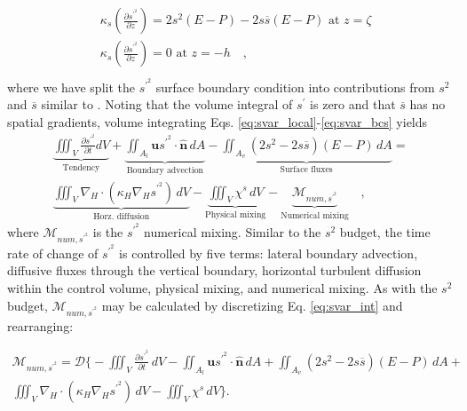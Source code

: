 \begin{align} \label{eq:svar_bcs}
    \begin{split}
         & \kappa_s \left({\frac{\partial s^{\prime^2}}{\partial z}} \right) = 2s^2(E-P) -2s \overline{s}(E-P) \,\, \textrm{at} \,\, z = \zeta \\
         & \kappa_s \left({\frac{\partial s^{\prime^2}}{\partial z}} \right) = 0 \,\, \textrm{at} \,\, z = -h \quad ,\\
    \end{split}
\end{align}
where we have split the $s^{\prime^2}$ surface boundary condition into contributions from $s^2$ and $\overline{s}$ similar to \citet{Lorenz_2021}. 
Noting that the volume integral of $s^\prime$ is zero and that $\overline{s}$ has no spatial gradients, volume integrating Eqs. \ref{eq:svar_local}-\ref{eq:svar_bcs} yields
\begin{equation} \label{eq:svar_int}
    \begin{split}
        \underbrace{\iiint_V \frac{\partial s^{\prime^2}}{\partial t} dV}_{\text{Tendency}} + \underbrace{\iint_{A_l} \mathbf{u}s^{\prime^2} \cdot \hat{\mathbf{n}} \, dA}_{\text{Boundary advection}}  - \underbrace{\iint_{A_{v}} \left(2s^2-2s \overline{s} \right)(E-P) \, dA}_{\text{Surface fluxes}} = \\
        \underbrace{\iiint_{V} \nabla_H \cdot \left( \kappa_H \nabla_H s^{\prime^2} \right) \, dV}_{\text{Horz. diffusion}}-
        \underbrace{\iiint_V \chi^s  \, dV}_{\text{Physical mixing}} - \underbrace{\mathcal{M}_{num, s^{\prime^2}}}_\text{Numerical mixing} \quad ,
   \end{split}
\end{equation}
where $\mathcal{M}_{num, s^{\prime^2}}$ is the $s^{\prime^2}$ numerical mixing. Similar to the $s^2$ budget, the time rate of change of $s^{\prime^2}$ is controlled by five terms: lateral boundary advection, diffusive fluxes through the vertical boundary, horizontal turbulent diffusion within the control volume, physical mixing, and numerical mixing. As with the $s^2$ budget, $\mathcal{M}_{num, s^{\prime^2}}$ may be calculated by discretizing Eq. \ref{eq:svar_int} and rearranging:

\begin{equation} \label{eq:sprime2_mnum}
    \begin{split}
        \mathcal{M}_{num, s^{\prime^2}} = \mathcal{D} \biggl\{-\iiint_V \frac{\partial s^{\prime^2}}{\partial t} \, dV - \iint_{A_l} \mathbf{u}s^{\prime^2} \cdot \hat{\mathbf{n}} \,  dA + \iint_{A_{v}} \left(2s^2-2s \overline{s} \right)(E-P) \, dA + \\
        \iiint_{V} \nabla_H \cdot \left(\kappa_H \nabla_H s^{\prime^2} \right) \, dV - \iiint_V \chi^s \, dV\biggl\}.
   \end{split}
\end{equation}

